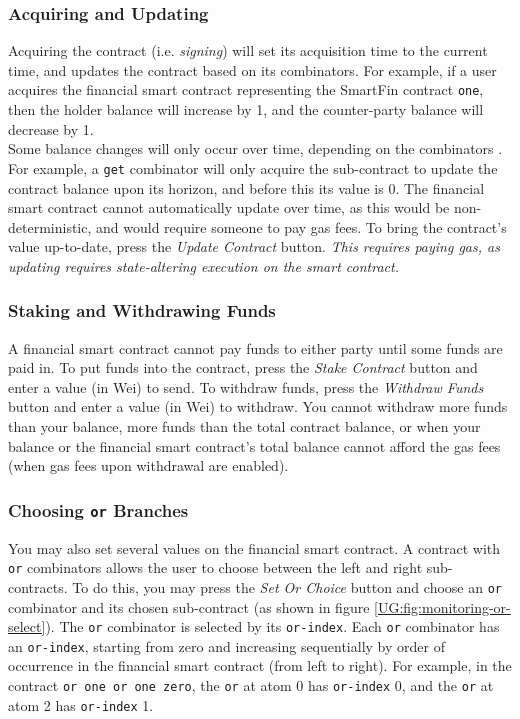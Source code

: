 \documentclass{article}
\begin{document}
\subsubsection{Acquiring and Updating}

Acquiring the contract (i.e. \textit{signing}) will set its acquisition time to the current time, and updates the contract based on its combinators. For example, if a user acquires the financial smart contract representing the SmartFin contract \texttt{one}, then the holder balance will increase by 1, and the counter-party balance will decrease by 1. \\

Some balance changes will only occur over time, depending on the combinators . For example, a \texttt{get} combinator will only acquire the sub-contract to update the contract balance upon its horizon, and before this its value is 0. The financial smart contract cannot automatically update over time, as this would be non-deterministic, and would require someone to pay gas fees. To bring the contract's value up-to-date, press the \textit{Update Contract} button. \textit{This requires paying gas, as updating requires state-altering execution on the smart contract.}


\subsubsection{Staking and Withdrawing Funds}

A financial smart contract cannot pay funds to either party until some funds are paid in. To put funds into the contract, press the \textit{Stake Contract} button and enter a value (in Wei) to send. To withdraw funds, press the \textit{Withdraw Funds} button and enter a value (in Wei) to withdraw. You cannot withdraw more funds than your balance, more funds than the total contract balance, or when your balance or the financial smart contract's total balance cannot afford the gas fees (when gas fees upon withdrawal are enabled).


\subsubsection{Choosing \texttt{or} Branches} \label{UG:or-branches}

You may also set several values on the financial smart contract. A contract with \texttt{or} combinators allows the user to choose between the left and right sub-contracts. To do this, you may press the \textit{Set Or Choice} button and choose an \texttt{or} combinator and its chosen sub-contract (as shown in figure \ref{UG:fig:monitoring-or-select}). The \texttt{or} combinator is selected by its \texttt{or-index}. Each \texttt{or} combinator has an \texttt{or-index}, starting from zero and increasing sequentially by order of occurrence in the financial smart contract (from left to right). For example, in the contract \texttt{or one or one zero}, the \texttt{or} at atom 0 has \texttt{or-index} 0, and the \texttt{or} at atom 2 has \texttt{or-index} 1.
\end{document}
